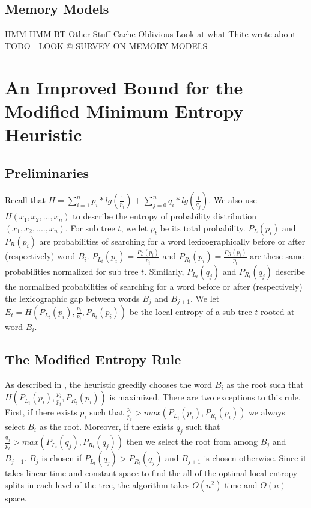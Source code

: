 \documentclass[letterpaper,12pt,titlepage,oneside,final]{book}
\theoremstyle{plain}
\begin{document}
\section{Memory Models}

HMM
HMM BT
Other Stuff
Cache Oblivious
Look at what Thite wrote about
TODO - LOOK @ SURVEY ON MEMORY MODELS


\chapter{An Improved Bound for the Modified Minimum Entropy Heuristic}

\section{Preliminaries}

Recall that $H = \sum_{i=1}^{n} p_i*lg(\frac{1}{p_i}) + \sum_{j=0}^{n} q_i*lg(\frac{1}{q_j})$. We also use $H(x_1,x_2,...,x_n)$ to describe the entropy of probability distribution $(x_1, x_2, ...., x_n)$. For sub tree $t$, we let $p_t$ be its total probability. $P_{L}(p_i)$ and $P_{R}(p_i)$ are probabilities of searching for a word lexicographically before or after (respectively) word $B_i$. $P_{L_t}(p_i)=\frac{P_L(p_i)}{p_t}$ and $P_{R_t}(p_i)=\frac{P_R(p_i)}{p_t}$ are these same probabilities normalized for sub tree $t$. Similarly, $P_{L_t}(q_j)$ and $P_{R_t}(q_j)$ describe the normalized probabilities of searching for a word before or after (respectively) the lexicographic gap between words $B_j$ and $B_{j+1}$. We let $E_t=H(P_{L_t}(p_i), \frac{p_i}{p_t}, P_{R_t}(p_i))$ be the local entropy of a sub tree $t$ rooted at word $B_i$.  

\section{The Modified Entropy Rule}

As described in \cite{guttler1980binary}, the heuristic greedily chooses the word $B_i$ as the root such that $H(P_{L_t}(p_i), \frac{p_i}{p_t}, P_{R_t}(p_i))$ is maximized. There are two exceptions to this rule. First, if there exists $p_i$ such that $\frac{p_i}{p_t} > max(P_{L_t}(p_i), P_{R_t}(p_i))$ we always select $B_i$ as the root. Moreover, if there exists $q_j$ such that $\frac{q_j}{p_t} > max(P_{L_t}(q_j), P_{R_t}(q_j))$ then we select the root from among $B_j$ and $B_{j+1}$. $B_j$ is chosen if $P_{L_t}(q_j) > P_{R_t}(q_j)$ and $B_{j+1}$ is chosen otherwise. Since it takes linear time and constant space to find the all of the optimal local entropy splits in each level of the tree, the algorithm takes $O(n^2)$ time and $O(n)$ space.  \\
\end{document}
